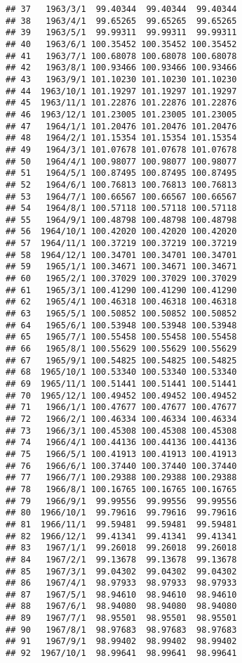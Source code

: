 \documentclass[
]{article}
\begin{document}
\begin{verbatim}
## 37   1963/3/1  99.40344  99.40344  99.40344
## 38   1963/4/1  99.65265  99.65265  99.65265
## 39   1963/5/1  99.99311  99.99311  99.99311
## 40   1963/6/1 100.35452 100.35452 100.35452
## 41   1963/7/1 100.68078 100.68078 100.68078
## 42   1963/8/1 100.93466 100.93466 100.93466
## 43   1963/9/1 101.10230 101.10230 101.10230
## 44  1963/10/1 101.19297 101.19297 101.19297
## 45  1963/11/1 101.22876 101.22876 101.22876
## 46  1963/12/1 101.23005 101.23005 101.23005
## 47   1964/1/1 101.20476 101.20476 101.20476
## 48   1964/2/1 101.15354 101.15354 101.15354
## 49   1964/3/1 101.07678 101.07678 101.07678
## 50   1964/4/1 100.98077 100.98077 100.98077
## 51   1964/5/1 100.87495 100.87495 100.87495
## 52   1964/6/1 100.76813 100.76813 100.76813
## 53   1964/7/1 100.66567 100.66567 100.66567
## 54   1964/8/1 100.57118 100.57118 100.57118
## 55   1964/9/1 100.48798 100.48798 100.48798
## 56  1964/10/1 100.42020 100.42020 100.42020
## 57  1964/11/1 100.37219 100.37219 100.37219
## 58  1964/12/1 100.34701 100.34701 100.34701
## 59   1965/1/1 100.34671 100.34671 100.34671
## 60   1965/2/1 100.37029 100.37029 100.37029
## 61   1965/3/1 100.41290 100.41290 100.41290
## 62   1965/4/1 100.46318 100.46318 100.46318
## 63   1965/5/1 100.50852 100.50852 100.50852
## 64   1965/6/1 100.53948 100.53948 100.53948
## 65   1965/7/1 100.55458 100.55458 100.55458
## 66   1965/8/1 100.55629 100.55629 100.55629
## 67   1965/9/1 100.54825 100.54825 100.54825
## 68  1965/10/1 100.53340 100.53340 100.53340
## 69  1965/11/1 100.51441 100.51441 100.51441
## 70  1965/12/1 100.49452 100.49452 100.49452
## 71   1966/1/1 100.47677 100.47677 100.47677
## 72   1966/2/1 100.46334 100.46334 100.46334
## 73   1966/3/1 100.45308 100.45308 100.45308
## 74   1966/4/1 100.44136 100.44136 100.44136
## 75   1966/5/1 100.41913 100.41913 100.41913
## 76   1966/6/1 100.37440 100.37440 100.37440
## 77   1966/7/1 100.29388 100.29388 100.29388
## 78   1966/8/1 100.16765 100.16765 100.16765
## 79   1966/9/1  99.99556  99.99556  99.99556
## 80  1966/10/1  99.79616  99.79616  99.79616
## 81  1966/11/1  99.59481  99.59481  99.59481
## 82  1966/12/1  99.41341  99.41341  99.41341
## 83   1967/1/1  99.26018  99.26018  99.26018
## 84   1967/2/1  99.13678  99.13678  99.13678
## 85   1967/3/1  99.04302  99.04302  99.04302
## 86   1967/4/1  98.97933  98.97933  98.97933
## 87   1967/5/1  98.94610  98.94610  98.94610
## 88   1967/6/1  98.94080  98.94080  98.94080
## 89   1967/7/1  98.95501  98.95501  98.95501
## 90   1967/8/1  98.97683  98.97683  98.97683
## 91   1967/9/1  98.99402  98.99402  98.99402
## 92  1967/10/1  98.99641  98.99641  98.99641

\end{verbatim}
\end{document}
